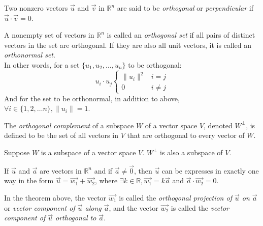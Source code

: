 \documentclass{report}
\begin{document}
		\begin{defn}
			Two nonzero vectors $\vec{u}$ and $\vec{v}$ in $\mathbb{R}^n$ are said to be \emph{orthogonal} or \emph{perpendicular} if $\vec{u} \cdot \vec{v} = 0$.
		\end{defn}
		
		\begin{defn}
			A nonempty set of vectors in $\mathbb{R}^n$ is called an \emph{orthogonal set} if all pairs of distinct vectors in the set are orthogonal. If they are also all unit vectors, it is called an \emph{orthonormal set}.\\
			In other words, for a set $\{u_1, u_2, \dots, u_n\}$ to be orthogonal:
			\begin{displaymath}
				u_i \cdot u_j
				\begin{cases}
					\|u_i\|^2 & i=j\\
					0 & i \ne j
				\end{cases}
			\end{displaymath}
			And for the set to be orthonormal, in addition to above, $\forall i \in \{1, 2, \dots n\}, \|u_i\|=1$.
		\end{defn}
		
		\begin{defn}
			The \emph{orthogonal complement} of a subspace $W$ of a vector space $V$, denoted $W^\perp$, is defined to be the set of all vectors in $V$ that are orthogonal to every vector of $W$.
		\end{defn}
		
		\begin{thm}
			Suppose $W$ is a subspace of a vector space $V$. $W^\perp$ is also a subspace of $V$.
		\end{thm}
		
		\begin{thm}
			If $\vec{u}$ and $\vec{a}$ are vectors in $\mathbb{R}^n$ and if $\vec{a} \ne \vec{0}$, then $\vec{u}$ can be expresses in exactly one way in the form $\vec{u}=\vec{w_1}+\vec{w_2}$, where $\exists k \in \mathbb{R}, \vec{w_1}=k\vec{a}$ and $\vec{a} \cdot \vec{w_2}=0$.
		\end{thm}
		
		In the theorem above, the vector $\vec{w_1}$ is called the \emph{orthogonal projection of $\vec{u}$ on $\vec{a}$} or \emph{vector component of $\vec{u}$ along $\vec{a}$}, and the vector $\vec{w_2}$ is called the \emph{vector component of $\vec{u}$ orthogonal to $\vec{a}$}.
		
\end{document}
